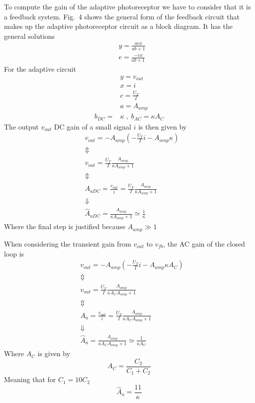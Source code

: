To compute the gain of the adaptive photoreceptor we have to consider that it is a feedback system. 
Fig.~4 shows the general form of the feedback circuit that makes up the adaptive photoreceptor circuit as a block diagram.
It has the general solutions
\begin{align*}
    & y = \frac{acx}{ab+1} \\
    & e = \frac{-cx}{ab+1} 
\end{align*}
For the adaptive circuit 
\begin{align*}
    &y = v_{out} \\
    &x = i \\
    &c = \frac{U_T}{I} \\
    &a = A_{amp} \\
    b_{DC} = &\kappa  \; , \; b_{AC} = \kappa A_C
\end{align*}
The output \(v_{out}\) DC gain of a small signal \(i\) is then given by 
\begin{align*}
    &v_{out} = -A_{amp}\left(-\frac{U_T}{I}i - A_{amp}\kappa \right) \\
    & \Updownarrow \\
    &v_{out} = \frac{U_T}{I}\frac{A_{amp}}{\kappa A_{amp} + 1} \\
    & \Updownarrow \\
    & A_{aDC} = \frac{v_{out}}{i} =\frac{U_T}{I} \frac{A_{amp}}{\kappa A_{amp}+1} \\
    & \Downarrow \\
    & \hat{A}_{aDC} = \frac{A_{amp}}{\kappa A_{amp}+1}  \simeq \frac{1}{\kappa}
\end{align*}
Where the final step is justified because \(A_{amp}\gg 1\)

When considering the transient gain from \(v_{out}\) to \(v_{fb}\), the AC
gain of the closed loop is
\begin{align*}
    &v_{out} = -A_{amp}\left(-\frac{U_T}{I}i - A_{amp}\kappa A_C \right) \\
    & \Updownarrow \\
    &v_{out} = \frac{U_T}{I}\frac{A_{amp}}{\kappa A_C A_{amp} + 1} \\
    & \Updownarrow \\
    & A_a = \frac{v_{out}}{i} =\frac{U_T}{I} \frac{A_{amp}}{\kappa A_C A_{amp}+1} \\
    & \Downarrow \\
    & \hat{A}_a = \frac{A_{amp}}{\kappa A_C A_{amp}+1}  \simeq \frac{1}{\kappa A_C}
\end{align*}
Where \(A_C\) is given by 
\begin{equation*}
    A_C = \frac{C_2}{C_1+C_2}
\end{equation*}
Meaning that for \(C_1 = 10C_2\)
\begin{equation*}
    \hat{A}_a = \frac{11}{\kappa}
\end{equation*}



